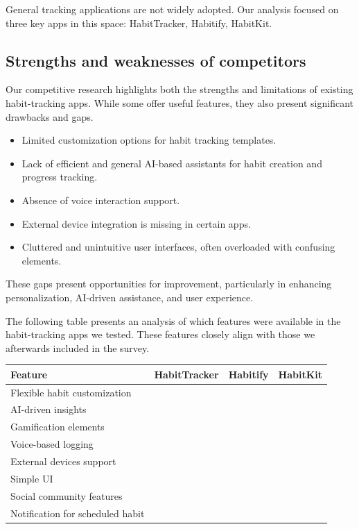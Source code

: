 \documentclass{article}
\newcommand{\vmark}{\textcolor{teal}{\ding{51}}}
\newcommand{\xmark}{\textcolor{red!70!black}{\ding{55}}}
\begin{document}
General tracking applications are not widely adopted.
Our analysis focused on three key apps in this space: HabitTracker, Habitify, HabitKit.

\subsection{Strengths and weaknesses of competitors}

Our competitive research highlights both the strengths and limitations of existing habit-tracking apps.
While some offer useful features, they also present significant drawbacks and gaps.

\begin{itemize}
    \item Limited customization options for habit tracking templates.
    \item Lack of efficient and general AI-based assistants for habit creation and progress tracking.
    \item Absence of voice interaction support.
    \item External device integration is missing in certain apps.
    \item Cluttered and unintuitive user interfaces, often overloaded with confusing elements.
\end{itemize}

These gaps present opportunities for improvement, particularly in enhancing personalization, AI-driven assistance, and user experience.

The following table presents an analysis of which features were available in the habit-tracking apps we tested.
These features closely align with those we afterwards included in the survey.

\begin{table}[H]
    \centering
    \begin{tabular}{l|c|c|c}
        \hline
        \textbf{Feature} & \textbf{HabitTracker} & \textbf{Habitify} & \textbf{HabitKit} \\
        \hline
        Flexible habit customization & \vmark \xmark & \vmark \xmark & \vmark \xmark \\
        AI-driven insights & \xmark & \xmark & \xmark \\
        Gamification elements & \vmark & \xmark & \vmark \\
        Voice-based logging & \xmark & \xmark & \xmark \\
        External devices support & \xmark & \vmark & \xmark \\
        Simple UI & \vmark & \vmark & \vmark \\
        Social community features & \vmark & \xmark & \xmark \\
        Notification for scheduled habit & \vmark & \vmark & \vmark \\
        \hline
    \end{tabular}
\end{table}
\end{document}
